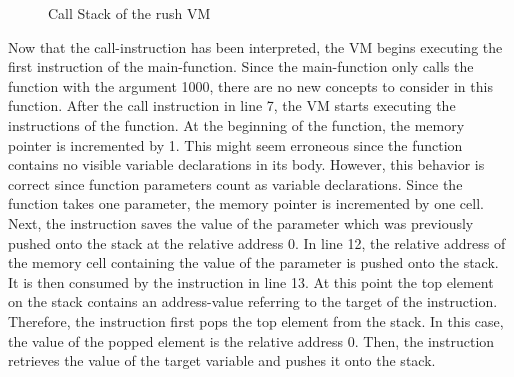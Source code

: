 \begin{figure}
	\centering
	\caption{Call Stack of the rush VM}\label{fig:rush_vm_call_stack}
\end{figure}

Now that the call-instruction has been interpreted, the VM begins executing the first instruction of the main-function.
Since the main-function only calls the  function with the argument 1000, there are no new concepts to consider in this function.
After the call instruction in line 7, the VM starts executing the instructions of the  function.
At the beginning of the  function, the memory pointer is incremented by 1.
This might seem erroneous since the  function contains no visible variable declarations in its body.
However, this behavior is correct since function parameters count as variable declarations.
Since the function takes one parameter, the memory pointer is incremented by one cell.
Next, the instruction  saves the value of the parameter which was previously pushed onto the stack at the relative address 0.
In line 12, the relative address of the memory cell containing the value of the parameter is pushed onto the stack.
It is then consumed by the  instruction in line 13.
At this point the top element on the stack contains an address-value referring to the target of the  instruction.
Therefore, the instruction first pops the top element from the stack.
In this case, the value of the popped element is the relative address 0.
Then, the instruction retrieves the value of the target variable and pushes it onto the stack.


